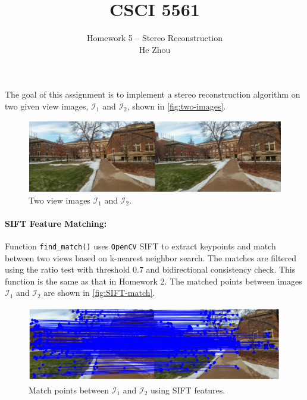 \documentclass[11pt]{scrartcl}
\begin{document}
\title{CSCI 5561}
\author{\Large Homework 5 -- Stereo Reconstruction\\
	He Zhou}  %
\maketitle
\newpage

The goal of this assignment is to implement a stereo reconstruction algorithm on two given view images, $\mathcal{I}_1$ and $\mathcal{I}_2$, shown in \autoref{fig:two-images}.
\begin{figure}[ht!]
	\begin{center}
		\includegraphics[width=0.7\linewidth]{two_images.png}
	\end{center}
	\caption{Two view images $\mathcal{I}_1$ and $\mathcal{I}_2$.}
	\label{fig:two-images}
\end{figure}
\paragraph{SIFT Feature Matching:}
Function \texttt{find\_match()} uses \texttt{OpenCV} SIFT to extract keypoints and match between two views based on  k-nearest neighbor search. The matches are filtered using the ratio test with threshold $0.7$ and bidirectional consistency check. This function is the same as that in Homework 2. The matched points between images $\mathcal{I}_1$ and $\mathcal{I}_2$ are shown in \autoref{fig:SIFT-match}.

\begin{figure}[ht!]
	\begin{center}
		\includegraphics[width=0.8\linewidth]{SIFT_match.png}
	\end{center}
	\caption{Match points between $\mathcal{I}_1$ and $\mathcal{I}_2$ using SIFT features.}
	\label{fig:SIFT-match}
\end{figure}
\end{document}
